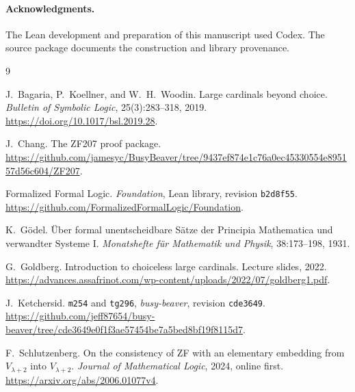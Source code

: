 \documentclass[11pt,letterpaper]{article}
\theoremstyle{definition}
\newcommand{\file}[1]{\texttt{\nolinkurl{#1}}}
\begin{document}
\paragraph{Acknowledgments.}
The Lean development and preparation of this manuscript used Codex.
The source package documents the construction and library provenance.

\begin{thebibliography}{9}

J.~Bagaria, P.~Koellner, and W.~H.~Woodin.
\newblock Large cardinals beyond choice.
\newblock \emph{Bulletin of Symbolic Logic}, 25(3):283--318, 2019.
\newblock \url{https://doi.org/10.1017/bsl.2019.28}.

J.~Chang.
\newblock The ZF207 proof package.
\newblock \url{https://github.com/jamesyc/BusyBeaver/tree/9437ef874e1c76a0ec45330554e895157d56c604/ZF207}.

Formalized Formal Logic.
\newblock \emph{Foundation}, Lean library, revision \file{b2d8f55}.
\newblock \url{https://github.com/FormalizedFormalLogic/Foundation}.

K.~G\"odel.
\newblock \"Uber formal unentscheidbare S\"atze der Principia Mathematica
und verwandter Systeme I.
\newblock \emph{Monatshefte f\"ur Mathematik und Physik}, 38:173--198, 1931.

G.~Goldberg.
\newblock Introduction to choiceless large cardinals.
\newblock Lecture slides, 2022.
\newblock \url{https://advances.assafrinot.com/wp-content/uploads/2022/07/goldberg1.pdf}.

J.~Ketchersid.
\newblock \texttt{m254} and \texttt{tg296}, \emph{busy-beaver}, revision
\file{cde3649}.
\newblock \url{https://github.com/jeff87654/busy-beaver/tree/cde3649e0f1f3ae57454be7a5bed8bf19f8115d7}.

F.~Schlutzenberg.
\newblock On the consistency of ZF with an elementary embedding from
$V_{\lambda+2}$ into $V_{\lambda+2}$.
\newblock \emph{Journal of Mathematical Logic}, 2024, online first.
\newblock \url{https://arxiv.org/abs/2006.01077v4}.

\end{thebibliography}
\end{document}
